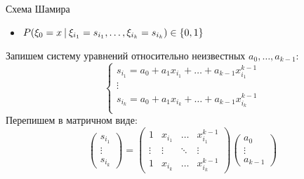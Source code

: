 \documentclass{beamer}
\begin{document}
\begin{frame}{Схема Шамира}
    \begin{itemize}
        \item \(P(\xi_0 = x \ \vline \ \xi_{i_1} = s_{i_1}, \dots, \xi_{i_k} = s_{i_k}) \in \{ 0, 1 \} \)
    \end{itemize}
    Запишем систему уравнений относительно неизвестных \(a_0, \dots, a_{k - 1}\):
    \[
    \begin{cases}
        s_{i_1} = a_0 + a_1x_{i_1} + \dots + a_{k - 1}x_{i_1}^{k - 1} \\
        \vdots \\
        s_{i_k} = a_0 + a_1x_{i_k} + \dots + a_{k - 1}x_{i_k}^{k - 1} \\
    \end{cases}
    \]
    Перепишем в матричном виде:
    \[
    \begin{pmatrix}
        s_{i_1} \\ \vdots \\ s_{i_k}
    \end{pmatrix} = \begin{pmatrix}
        1 & x_{i_1} & \dots & x_{i_1}^{k - 1} \\
        \vdots & \vdots & \ddots & \vdots \\
        1 & x_{i_k} & \dots & x_{i_k}^{k - 1}
    \end{pmatrix} \begin{pmatrix}
        a_0 \\ \vdots \\ a_{k - 1}
    \end{pmatrix}
    \]
\end{frame}
\end{document}
